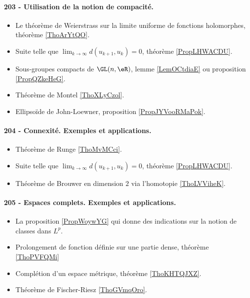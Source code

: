 \paragraph{203 - Utilisation de la notion de compacité.}
\begin{itemize}
    \item Le théorème de Weierstrass sur la limite uniforme de fonctions holomorphes, théorème \ref{ThoArYtQO}.
    \item Suite telle que \( \lim_{k\to \infty} d(u_{k+1},u_k)=0\), théorème \ref{PropLHWACDU}.
    \item Sous-groupes compacts de \( \GL(n,\eR)\), lemme \ref{LemOCtdiaE} ou proposition \ref{PropQZkeHeG}.
    \item Théorème de Montel \ref{ThoXLyCzol}.
    \item Ellipsoïde de John-Loewner, proposition \ref{PropJYVooRMaPok}.
\end{itemize}
\paragraph{204 - Connexité. Exemples et applications.}
\begin{itemize}
    \item Théorème de Runge \ref{ThoMvMCci}.
    \item Suite telle que \( \lim_{k\to \infty} d(u_{k+1},u_k)=0\), théorème \ref{PropLHWACDU}.
    \item Théorème de Brouwer en dimension \( 2\) via l'homotopie \ref{ThoLVViheK}.
\end{itemize}
\paragraph{205 - Espaces complets. Exemples et applications.}
\begin{itemize}
    \item La proposition \ref{PropWoywYG} qui donne des indications sur la notion de classes dans \( L^p\).
    \item Prolongement de fonction définie sur une partie dense, théorème \ref{ThoPVFQMi}
    \item Complétion d'un espace métrique, théorème \ref{ThoKHTQJXZ}.
    \item Théorème de Fischer-Riesz \ref{ThoGVmqOro}.
\end{itemize}
